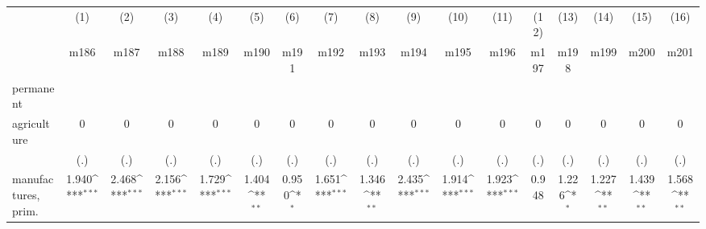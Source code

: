 {
\def\sym#1{\ifmmode^{#1}\else\(^{#1}\)\fi}
\begin{tabular}{l*{16}{c}}
\hline\hline
                    &\multicolumn{1}{c}{(1)}&\multicolumn{1}{c}{(2)}&\multicolumn{1}{c}{(3)}&\multicolumn{1}{c}{(4)}&\multicolumn{1}{c}{(5)}&\multicolumn{1}{c}{(6)}&\multicolumn{1}{c}{(7)}&\multicolumn{1}{c}{(8)}&\multicolumn{1}{c}{(9)}&\multicolumn{1}{c}{(10)}&\multicolumn{1}{c}{(11)}&\multicolumn{1}{c}{(12)}&\multicolumn{1}{c}{(13)}&\multicolumn{1}{c}{(14)}&\multicolumn{1}{c}{(15)}&\multicolumn{1}{c}{(16)}\\
                    &\multicolumn{1}{c}{m186}&\multicolumn{1}{c}{m187}&\multicolumn{1}{c}{m188}&\multicolumn{1}{c}{m189}&\multicolumn{1}{c}{m190}&\multicolumn{1}{c}{m191}&\multicolumn{1}{c}{m192}&\multicolumn{1}{c}{m193}&\multicolumn{1}{c}{m194}&\multicolumn{1}{c}{m195}&\multicolumn{1}{c}{m196}&\multicolumn{1}{c}{m197}&\multicolumn{1}{c}{m198}&\multicolumn{1}{c}{m199}&\multicolumn{1}{c}{m200}&\multicolumn{1}{c}{m201}\\
\hline
permanent           &                     &                     &                     &                     &                     &                     &                     &                     &                     &                     &                     &                     &                     &                     &                     &                     \\
agriculture         &           0         &           0         &           0         &           0         &           0         &           0         &           0         &           0         &           0         &           0         &           0         &           0         &           0         &           0         &           0         &           0         \\
                    &         (.)         &         (.)         &         (.)         &         (.)         &         (.)         &         (.)         &         (.)         &         (.)         &         (.)         &         (.)         &         (.)         &         (.)         &         (.)         &         (.)         &         (.)         &         (.)         \\
[1em]
manufactures, prim. &       1.940\sym{***}&       2.468\sym{***}&       2.156\sym{***}&       1.729\sym{***}&       1.404\sym{**} &       0.950\sym{*}  &       1.651\sym{***}&       1.346\sym{**} &       2.435\sym{***}&       1.914\sym{***}&       1.923\sym{***}&       0.948         &       1.226\sym{*}  &       1.227\sym{**} &       1.439\sym{**} &       1.568\sym{**} \\

\end{tabular}}

